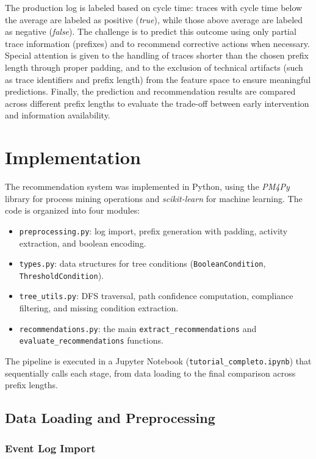 \documentclass{article}
\begin{document}
\noindent
The production log is labeled based on cycle time: traces with cycle time below the average are labeled as positive (\textit{true}), while those above average are labeled as negative (\textit{false}). The challenge is to predict this outcome using only partial trace information (prefixes) and to recommend corrective actions when necessary. Special attention is given to the handling of traces shorter than the chosen prefix length through proper padding, and to the exclusion of technical artifacts (such as trace identifiers and prefix length) from the feature space to ensure meaningful predictions. Finally, the prediction and recommendation results are compared across different prefix lengths to evaluate the trade-off between early intervention and information availability.


\section{Implementation}

The recommendation system was implemented in Python, using the \textit{PM4Py} library for process mining operations and \textit{scikit-learn} for machine learning. The code is organized into four modules:
\begin{itemize}
    \item \texttt{preprocessing.py}: log import, prefix generation with padding, activity extraction, and boolean encoding.
    \item \texttt{types.py}: data structures for tree conditions (\texttt{BooleanCondition}, \texttt{ThresholdCondition}).
    \item \texttt{tree\_utils.py}: DFS traversal, path confidence computation, compliance filtering, and missing condition extraction.
    \item \texttt{recommendations.py}: the main \texttt{extract\_recommendations} and \texttt{evaluate\_recommendations} functions.
\end{itemize}

\noindent
The pipeline is executed in a Jupyter Notebook (\texttt{tutorial\_completo.ipynb}) that sequentially calls each stage, from data loading to the final comparison across prefix lengths.

\subsection{Data Loading and Preprocessing}

\subsubsection{Event Log Import}
\end{document}
